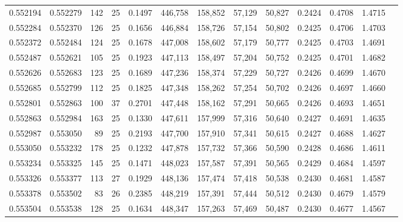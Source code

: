 \begin{tabular}{rrrrrrrrrrrrr}
0.552194 & 0.552279 & 142 &  25 &                                     0.1497 & 446,758 & 158,852 &  57,129 &  50,827 & 0.2424 & 0.4708 & 1.4715 \\
0.552284 & 0.552370 & 126 &  25 &                                     0.1656 & 446,884 & 158,726 &  57,154 &  50,802 & 0.2425 & 0.4706 & 1.4703 \\
0.552372 & 0.552484 & 124 &  25 &                                     0.1678 & 447,008 & 158,602 &  57,179 &  50,777 & 0.2425 & 0.4703 & 1.4691 \\
0.552487 & 0.552621 & 105 &  25 &                                     0.1923 & 447,113 & 158,497 &  57,204 &  50,752 & 0.2425 & 0.4701 & 1.4682 \\
0.552626 & 0.552683 & 123 &  25 &                                     0.1689 & 447,236 & 158,374 &  57,229 &  50,727 & 0.2426 & 0.4699 & 1.4670 \\
0.552685 & 0.552799 & 112 &  25 &                                     0.1825 & 447,348 & 158,262 &  57,254 &  50,702 & 0.2426 & 0.4697 & 1.4660 \\
0.552801 & 0.552863 & 100 &  37 &                                     0.2701 & 447,448 & 158,162 &  57,291 &  50,665 & 0.2426 & 0.4693 & 1.4651 \\
0.552863 & 0.552984 & 163 &  25 &                                     0.1330 & 447,611 & 157,999 &  57,316 &  50,640 & 0.2427 & 0.4691 & 1.4635 \\
0.552987 & 0.553050 &  89 &  25 &                                     0.2193 & 447,700 & 157,910 &  57,341 &  50,615 & 0.2427 & 0.4688 & 1.4627 \\
0.553050 & 0.553232 & 178 &  25 &                                     0.1232 & 447,878 & 157,732 &  57,366 &  50,590 & 0.2428 & 0.4686 & 1.4611 \\
0.553234 & 0.553325 & 145 &  25 &                                     0.1471 & 448,023 & 157,587 &  57,391 &  50,565 & 0.2429 & 0.4684 & 1.4597 \\
0.553326 & 0.553377 & 113 &  27 &                                     0.1929 & 448,136 & 157,474 &  57,418 &  50,538 & 0.2430 & 0.4681 & 1.4587 \\
0.553378 & 0.553502 &  83 &  26 &                                     0.2385 & 448,219 & 157,391 &  57,444 &  50,512 & 0.2430 & 0.4679 & 1.4579 \\
0.553504 & 0.553538 & 128 &  25 &                                     0.1634 & 448,347 & 157,263 &  57,469 &  50,487 & 0.2430 & 0.4677 & 1.4567 \\

\end{tabular}
